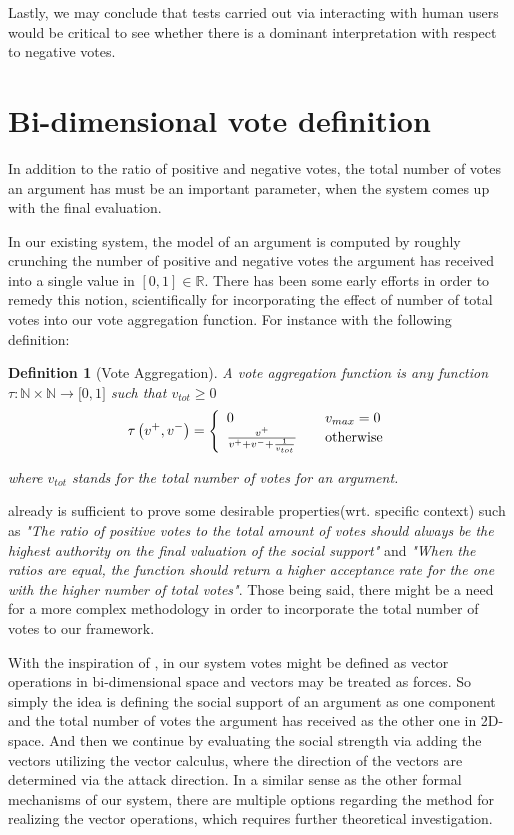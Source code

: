 \documentclass{article}
\newtheorem{definition}{Definition}
\begin{document}
Lastly, we may conclude that tests carried out via interacting with human users would be critical to see whether there is a dominant interpretation with respect to negative votes. 



\section{Bi-dimensional vote definition}
In addition to the ratio of positive and negative votes, the total number of votes an argument has must be an important parameter, when the system comes up with the final evaluation.

 In our existing system, the model of an argument is computed by roughly crunching  the number of positive and negative votes the argument has received into a single value in  $[0,1] \in \mathbb{R}$. There has been some early efforts in order to remedy this notion, scientifically for incorporating the effect of number of total votes into our vote aggregation function. For instance with the following definition:

\newpage
\begin{definition}
[Vote Aggregation]A vote aggregation function is any function
$\tau:
\mathbb{N}
\times
\mathbb{N}
\rightarrow\lbrack0,1]$ such that $v_{tot}\geq0$
\[
\tau\left(  v^{+},v^{-}\right)  =\left\{
\begin{array}
[c]{lll}
0 &  & v_{max}=0\\
\frac{v^{+}}{v^{+}+v^{-}+\frac{1}{v_{tot}}} &  & \text{otherwise}
\end{array}
\right.
\]

where $v_{tot}$ stands for the total number of votes for an argument.
\end{definition}

already is sufficient to prove some desirable properties(wrt. specific context) such as \textit{"The ratio of positive votes to the total amount of votes should always be the highest authority on the final valuation of the social support"} and \textit{"When the ratios are equal, the function should return a higher acceptance rate for the one with the higher number of total votes"}. Those being said, there might be a need for a more complex methodology in order to incorporate the total number of votes to our framework.

With the inspiration of \cite{baroniTAB13}, in our system votes might be defined as vector operations in bi-dimensional space and vectors may be treated as forces. So simply the idea is defining the social support of an argument as one component and the total number of votes the argument has received as the other one in 2D-space. And then we continue by evaluating the social strength via adding the vectors utilizing the vector calculus, where the direction of the vectors are determined via the attack direction. In a similar sense as the other formal mechanisms of our system, there are multiple options regarding the method for realizing the vector operations, which requires further theoretical investigation.
\end{document}
